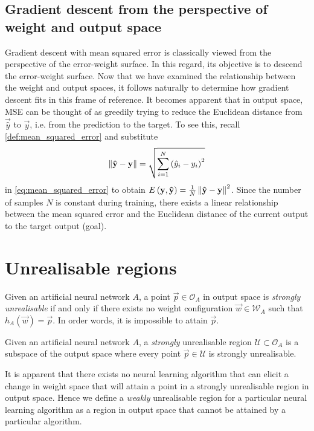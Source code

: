 \subsection{Gradient descent from the perspective of weight and output space}
Gradient descent with mean squared error is classically viewed from the perspective of the error-weight surface. 
In this regard, its objective is to descend the error-weight surface.
Now that we have examined the relationship between the weight and output spaces, it follows naturally to determine how gradient descent fits in this frame of reference.
It becomes apparent that in output space, MSE can be thought of as greedily trying to reduce the Euclidean distance from $\vec{\hat{y}}$ to $\vec{y}$, i.e. from the prediction to the target.
To see this, recall \ref{def:mean_squared_error} and substitute
\begin{equation*}
    \left\lVert\mathbf{\hat{y}}-\mathbf{y}\right\rVert=\sqrt{\sum_{i=1}^N{\left(\hat{y}_i - y_i\right)^2}}
\end{equation*}
in \ref{eq:mean_squared_error} to obtain
$
    E\left( \mathbf{y}, \mathbf{\hat{y}} \right) = \frac{1}{N} \left\lVert\mathbf{\hat{y}}-\mathbf{y}\right\rVert^2
$. Since the number of samples $N$ is constant during training, there exists a linear relationship between the mean squared error and the Euclidean distance of the current output to the target output (goal).

\section{Unrealisable regions}
\begin{definition}
    \label{def:unrealisable_point}
    Given an artificial neural network $A$, a point $\vec{p} \in \mathcal{O}_A$ in output space is \textit{strongly unrealisable} if and only if there exists no weight configuration $\vec{w} \in \mathcal{W}_A$ such that $h_A(\vec{w}) = \vec{p}$.
    In order words, it is impossible to attain $\vec{p}$.
\end{definition}
\begin{definition}
    \label{def:unrealisable_region}
    Given an artificial neural network $A$, a \textit{strongly} unrealisable region $\mathcal{U} \subset \mathcal{O}_A$ is a subspace of the output space where every point $\vec{p} \in \mathcal{U}$ is strongly unrealisable.
    
    It is apparent that there exists no neural learning algorithm that can elicit a change in weight space that will attain a point in a strongly unrealisable region in output space.
    Hence we define a \textit{weakly} unrealisable region for a particular neural learning algorithm as a region in output space that cannot be attained by a particular algorithm.
\end{definition}

